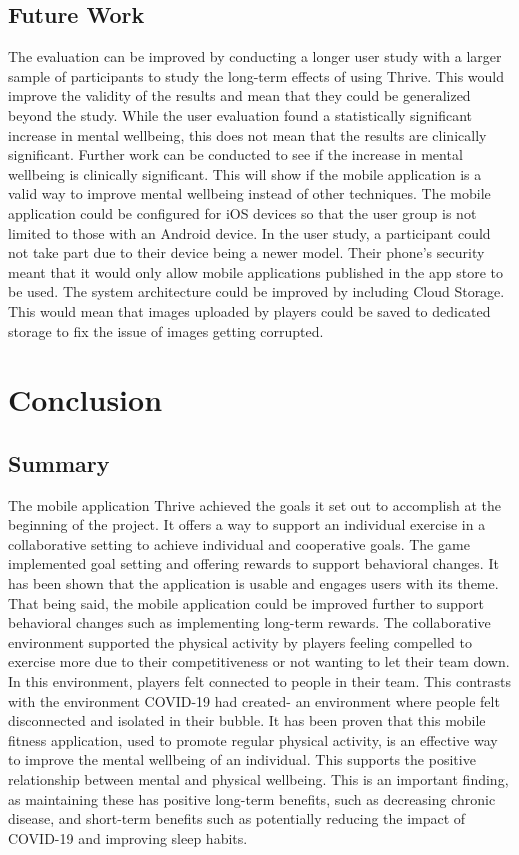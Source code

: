 \documentclass{l4proj}
\begin{document}
\section{Future Work  } 
The evaluation can be improved by conducting a longer user study with a larger sample of participants to study the long-term effects of using Thrive. This would improve the validity of the results and mean that they could be generalized beyond the study. While the user evaluation found a statistically significant increase in mental wellbeing, this does not mean that the results are clinically significant. Further work can be conducted to see if the increase in mental wellbeing is clinically significant. This will show if the mobile application is a valid way to improve mental wellbeing instead of other techniques.   
The mobile application could be configured for iOS devices so that the user group is not limited to those with an Android device. In the user study, a participant could not take part due to their device being a newer model. Their phone’s security meant that it would only allow mobile applications published in the app store to be used. The system architecture could be improved by including Cloud Storage. This would mean that images uploaded by players could be saved to dedicated storage to fix the issue of images getting corrupted. 


\chapter{Conclusion}
\section{Summary} 
The mobile application Thrive achieved the goals it set out to accomplish at the beginning of the project. It offers a way to support an individual exercise in a collaborative setting to achieve individual and cooperative goals. The game implemented goal setting and offering rewards to support behavioral changes. It has been shown that the application is usable and engages users with its theme. That being said, the mobile application could be improved further to support behavioral changes such as implementing long-term rewards.
The collaborative environment supported the physical activity by players feeling compelled to exercise more due to their competitiveness or not wanting to let their team down. In this environment, players felt connected to people in their team. This contrasts with the environment COVID-19 had created- an environment where people felt disconnected and isolated in their bubble. 
It has been proven that this mobile fitness application, used to promote regular physical activity, is an effective way to improve the mental wellbeing of an individual. This supports the positive relationship between mental and physical wellbeing. This is an important finding, as maintaining these has positive long-term benefits, such as decreasing chronic disease, and short-term benefits such as potentially reducing the impact of COVID-19 and improving sleep habits. 
\end{document}
